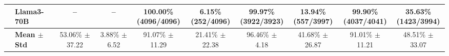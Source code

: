 \begin{table}[t]
{\begin{tabular}{ll*{8}{c}}
 & Llama3-70B & -- & -- & \makecell[c]{100.00\%\\[-1pt]\scriptsize(4096/4096)} & \makecell[c]{6.15\%\\[-1pt]\scriptsize(252/4096)} & \makecell[c]{99.97\%\\[-1pt]\scriptsize(3922/3923)} & \makecell[c]{13.94\%\\[-1pt]\scriptsize(557/3997)} & \makecell[c]{99.90\%\\[-1pt]\scriptsize(4037/4041)} & \makecell[c]{35.63\%\\[-1pt]\scriptsize(1423/3994)} \\
\midrule
 & \textbf{Mean $\pm$ Std} & 53.06\% $\pm$ 37.22 & 3.88\% $\pm$ 6.52 & 91.07\% $\pm$ 11.29 & 21.41\% $\pm$ 22.38 & 96.46\% $\pm$ 4.18 & 41.68\% $\pm$ 26.87 & 91.01\% $\pm$ 11.21 & 48.51\% $\pm$ 33.07 \\
\bottomrule
\end{tabular}
}
\end{table}


